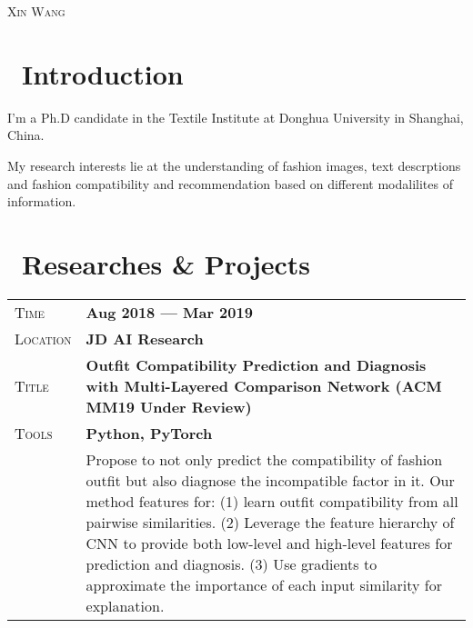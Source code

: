 \documentclass[a4paper, oneside, final]{scrartcl} %
\newcommand{\gray}{\rowcolor[gray]{.90}} %
\begin{document}
\begin{center} %


{\fontsize{36}{36}\selectfont\scshape Xin Wang} %


\section{\faInfo\ Introduction}
\begin{flushleft}
I'm a Ph.D candidate in the Textile Institute at Donghua University in Shanghai, China.

My research interests lie at the understanding of fashion images, text descrptions and fashion compatibility and recommendation based on different modalilites of information.
\end{flushleft}


\section{\faUsers\ Researches \& Projects}

\begin{tabularx}{0.97\linewidth}{>{\raggedleft\scshape}p{2cm}X}
\gray Time & \textbf{Aug 2018 --- Mar 2019}\\
\gray Location & \textbf{JD AI Research} \\
\gray Title & \textbf{Outfit Compatibility Prediction and Diagnosis with Multi-Layered Comparison Network (ACM MM19 Under Review)}\\
\gray Tools & \textbf{Python, PyTorch}\\
& Propose to not only predict the compatibility of fashion outfit but also diagnose the incompatible factor in it. Our method features for: (1) learn outfit compatibility from all pairwise similarities. (2) Leverage the feature hierarchy of CNN to provide both low-level and high-level features for prediction and diagnosis. (3) Use gradients to approximate the importance of each input similarity for explanation.
\end{tabularx}


\end{center}
\end{document}
